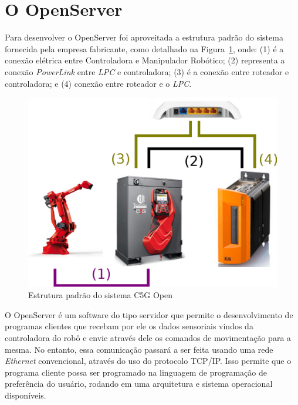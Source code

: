 \section{O OpenServer}
    
    Para desenvolver o OpenServer foi aproveitada a estrutura padrão do sistema fornecida pela empresa fabricante, como detalhado na Figura~\ref{conexoes-padrao}, onde: (1) é a conexão elétrica entre Controladora e Manipulador Robótico; (2) representa a conexão \textit{PowerLink} entre \textit{LPC} e controladora; (3) é a conexão entre roteador e controladora; e (4) conexão entre roteador e o \textit{LPC}.

    \begin{figure}[ht]
        \centering
        \includegraphics[width=\columnwidth]{imagens/Conexoes/conexoes-padrao.eps}
        \small 
        \centering 
        \caption{Estrutura padrão do sistema C5G Open}
        
        \label{conexoes-padrao}
    \end{figure}
      
    O OpenServer é um software do tipo servidor que permite o desenvolvimento de programas clientes que recebam por ele os dados sensoriais vindos da controladora do robô e envie através dele os comandos de movimentação para a mesma. No entanto, essa comunicação passará a ser feita usando uma rede \textit{Ethernet} convencional, através do uso do protocolo TCP/IP. Isso permite que o programa cliente possa ser programado na linguagem de programação de preferência do usuário, rodando em uma arquitetura e sistema operacional disponíveis.
    
